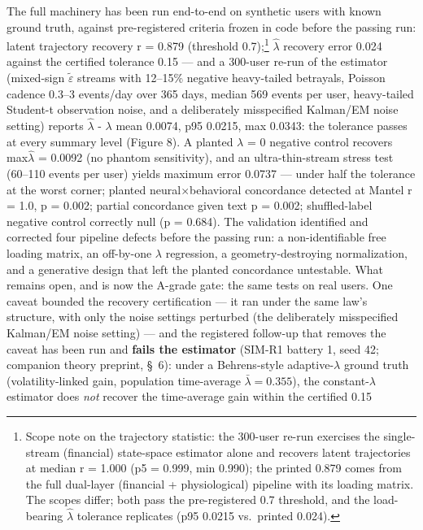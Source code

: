 \documentclass[
]{article}
\begin{document}
The full machinery has been run end-to-end on synthetic users with known
ground truth, against pre-registered criteria frozen in code before the
passing run: latent trajectory recovery r = 0.879 (threshold
0.7);\footnote{Scope note on the trajectory statistic: the 300-user
  re-run exercises the single-stream (financial) state-space estimator
  alone and recovers latent trajectories at median r = 1.000 (p5 =
  0.999, min 0.990); the printed 0.879 comes from the full dual-layer
  (financial + physiological) pipeline with its loading matrix. The
  scopes differ; both pass the pre-registered 0.7 threshold, and the
  load-bearing \(\hat{\lambda}\) tolerance replicates (p95 0.0215
  vs.~printed 0.024).} \(\hat{\lambda}\) recovery error 0.024 against
the certified tolerance 0.15 --- and a 300-user re-run of the estimator
(mixed-sign \(\tilde{\varepsilon}\) streams with 12--15\% negative
heavy-tailed betrayals, Poisson cadence 0.3--3 events/day over 365 days,
median 569 events per user, heavy-tailed Student-t observation noise,
and a deliberately misspecified Kalman/EM noise setting) reports
\textbar{}\(\hat{\lambda}\) - \(\lambda\)\textbar{} mean 0.0074, p95
0.0215, max 0.0343: the tolerance passes at every summary level (Figure
8). A planted \(\lambda\) = 0 negative control recovers
max\textbar{}\(\hat{\lambda}\)\textbar{} = 0.0092 (no phantom
sensitivity), and an ultra-thin-stream stress test (60--110 events per
user) yields maximum error 0.0737 --- under half the tolerance at the
worst corner; planted neural\(\times\)behavioral concordance detected at
Mantel r = 1.0, p = 0.002; partial concordance given text p = 0.002;
shuffled-label negative control correctly null (p = 0.684). The
validation identified and corrected four pipeline defects before the
passing run: a non-identifiable free loading matrix, an off-by-one
\(\lambda\) regression, a geometry-destroying normalization, and a
generative design that left the planted concordance untestable. What
remains open, and is now the A-grade gate: the same tests on real users.
One caveat bounded the recovery certification --- it ran under the same
law's structure, with only the noise settings perturbed (the
deliberately misspecified Kalman/EM noise setting) --- and the
registered follow-up that removes the caveat has been run and
\textbf{fails the estimator} (SIM-R1 battery 1, seed 42; companion
theory preprint, §~6): under a Behrens-style adaptive-\(\lambda\) ground
truth (volatility-linked gain, population time-average
\(\bar{\lambda} = 0.355\)), the constant-\(\lambda\) estimator does
\emph{not} recover the time-average gain within the certified 0.15
\end{document}
